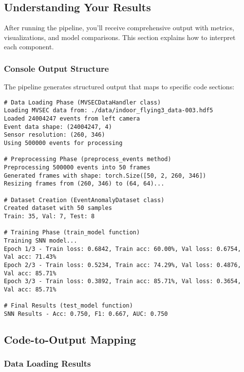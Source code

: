 \documentclass[12pt,a4paper]{article}
\begin{document}
\subsection{Understanding Your Results}

After running the pipeline, you'll receive comprehensive output with metrics, visualizations, and model comparisons. This section explains how to interpret each component.

\subsubsection{Console Output Structure}

The pipeline generates structured output that maps to specific code sections:

\begin{lstlisting}[caption={Typical Console Output Structure}]
# Data Loading Phase (MVSECDataHandler class)
Loading MVSEC data from: ./data/indoor_flying3_data-003.hdf5
Loaded 24004247 events from left camera
Event data shape: (24004247, 4)
Sensor resolution: (260, 346)
Using 500000 events for processing

# Preprocessing Phase (preprocess_events method)
Preprocessing 500000 events into 50 frames
Generated frames with shape: torch.Size([50, 2, 260, 346])
Resizing frames from (260, 346) to (64, 64)...

# Dataset Creation (EventAnomalyDataset class)
Created dataset with 50 samples
Train: 35, Val: 7, Test: 8

# Training Phase (train_model function)
Training SNN model...
Epoch 1/3 - Train loss: 0.6842, Train acc: 60.00%, Val loss: 0.6754, Val acc: 71.43%
Epoch 2/3 - Train loss: 0.5234, Train acc: 74.29%, Val loss: 0.4876, Val acc: 85.71%
Epoch 3/3 - Train loss: 0.3892, Train acc: 85.71%, Val loss: 0.3654, Val acc: 85.71%

# Final Results (test_model function)
SNN Results - Acc: 0.750, F1: 0.667, AUC: 0.750
\end{lstlisting}

\subsection{Code-to-Output Mapping}

\subsubsection{Data Loading Results}
\end{document}
